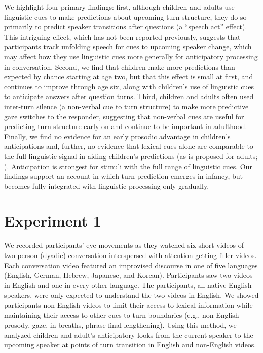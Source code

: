 \documentclass[authoryear, 12pt]{elsarticle}
\begin{document}
We highlight four primary findings: first, although children and adults use linguistic cues to make predictions about upcoming turn structure, they do so primarily to predict speaker transitions after questions (a ``speech act'' effect). This intriguing effect, which has not been reported previously, suggests that participants track unfolding speech for cues to upcoming speaker change, which may affect how they use linguistic cues more generally for anticipatory processing in conversation. Second, we find that children make more predictions than expected by chance starting at age two, but that this effect is small at first, and continues to improve through age six, along with children's use of linguistic cues to anticipate answers after question turns. Third, children and adults often used inter-turn silence (a non-verbal cue to turn structure) to make more predictive gaze switches to the responder, suggesting that non-verbal cues are useful for predicting turn structure early on and continue to be important in adulthood. Finally, we find no evidence for an early prosodic advantage in children's anticipations and, further, no evidence that lexical cues alone are comparable to the full linguistic signal in aiding children's predictions (as is proposed for adults; \citealp{de-ruiter2006}). Anticipation is strongest for stimuli with the full range of linguistic cues. Our findings support an account in which turn prediction emerges in infancy, but becomes fully integrated with linguistic processing only gradually.

\section*{Experiment 1}
\label{sec:exp1}

We recorded participants' eye movements as they watched six short videos of two-person (dyadic) conversation interspersed with attention-getting filler videos. Each conversation video featured an improvised discourse in one of five languages (English, German, Hebrew, Japanese, and Korean). Participants saw two videos in English and one in every other language. The participants, all native English speakers, were only expected to understand the two videos in English. We showed participants non-English videos to limit their access to lexical information while maintaining their access to other cues to turn boundaries (e.g., non-English prosody, gaze, in-breaths, phrase final lengthening). Using this method, we analyzed children and adult's anticipatory looks from the current speaker to the upcoming speaker at points of turn transition in English and non-English videos.
\end{document}
